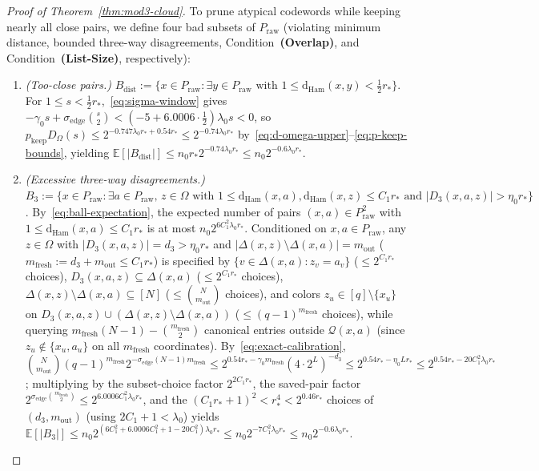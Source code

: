 \documentclass[11pt]{article}
\theoremstyle{definition}
\theoremstyle{remark}
\newcommand{\Ham}{\mathrm{Ham}}
\newcommand{\dHam}{\mathrm{d}_{\Ham}}
\begin{document}
\begin{proof}[Proof of Theorem~\ref{thm:mod3-cloud}]
To prune atypical codewords while keeping nearly all close pairs, we define four bad subsets of $P_{\mathrm{raw}}$ (violating minimum distance, bounded three-way disagreements, Condition~\textbf{(Overlap)}, and Condition~\textbf{(List-Size)}, respectively):
\begin{enumerate}[label=(\arabic*),leftmargin=2em]
  \item \emph{(Too-close pairs.)} $B_{\mathrm{dist}} := \bigl\{x \in P_{\mathrm{raw}} : \exists y \in P_{\mathrm{raw}} \text{ with } 1 \le \dHam(x, y) < \frac{1}{2} r_*\bigr\}$. For $1 \le s < \frac{1}{2} r_*$,~\eqref{eq:sigma-window} gives $-\gamma_0 s + \sigma_{\mathrm{edge}}\binom{s}{2} < (-5 + 6.0006 \cdot \frac{1}{2})\lambda_0 s < 0$, so $p_{\mathrm{keep}} D_\Omega(s) \le 2^{-0.747\lambda_0 r_* + 0.54 r_*} \le 2^{-0.74\lambda_0 r_*}$ by~\eqref{eq:d-omega-upper}--\eqref{eq:p-keep-bounds}, yielding $\mathbb{E}[|B_{\mathrm{dist}}|] \le n_0 r_* 2^{-0.74\lambda_0 r_*} \le n_0 2^{-0.6 \lambda_0 r_*}$.
  \item \emph{(Excessive three-way disagreements.)} $B_3 := \bigl\{x \in P_{\mathrm{raw}} : \exists a \in P_{\mathrm{raw}},\, z \in \Omega \text{ with } 1 \le \dHam(x, a), \dHam(x, z) \le C_1 r_* \text{ and } |D_3(x, a, z)| > \eta_0 r_*\bigr\}$. By~\eqref{eq:ball-expectation}, the expected number of pairs $(x, a) \in P_{\mathrm{raw}}^2$ with $1 \le \dHam(x, a) \le C_1 r_*$ is at most $n_0 2^{6 C_1^2 \lambda_0 r_*}$. Conditioned on $x, a \in P_{\mathrm{raw}}$, any $z \in \Omega$ with $|D_3(x, a, z)| = d_3 > \eta_0 r_*$ and $|\Delta(x, z) \setminus \Delta(x, a)| = m_{\mathrm{out}}$ ($m_{\mathrm{fresh}} := d_3 + m_{\mathrm{out}} \le C_1 r_*$) is specified by $\{v \in \Delta(x, a) : z_v = a_v\}$ ($\le 2^{C_1 r_*}$ choices), $D_3(x, a, z) \subseteq \Delta(x, a)$ ($\le 2^{C_1 r_*}$ choices), $\Delta(x, z) \setminus \Delta(x, a) \subseteq [N]$ ($\le \binom{N}{m_{\mathrm{out}}}$ choices), and colors $z_u \in [q] \setminus \{x_u\}$ on $D_3(x, a, z) \cup (\Delta(x, z) \setminus \Delta(x, a))$ ($\le (q - 1)^{m_{\mathrm{fresh}}}$ choices), while querying $m_{\mathrm{fresh}}(N - 1) - \binom{m_{\mathrm{fresh}}}{2}$ canonical entries outside $\mathcal{Q}(x, a)$ (since $z_u \notin \{x_u, a_u\}$ on all $m_{\mathrm{fresh}}$ coordinates). By~\eqref{eq:exact-calibration}, $\binom{N}{m_{\mathrm{out}}}(q - 1)^{m_{\mathrm{fresh}}} 2^{-\sigma_{\mathrm{edge}}(N - 1)m_{\mathrm{fresh}}} \le 2^{0.54 r_* - \gamma_0 m_{\mathrm{fresh}}}(4 \cdot 2^L)^{-d_3} \le 2^{0.54 r_* - \eta_0 L r_*} \le 2^{0.54 r_* - 20 C_1^2 \lambda_0 r_*}$; multiplying by the subset-choice factor $2^{2 C_1 r_*}$, the saved-pair factor $2^{\sigma_{\mathrm{edge}}\binom{m_{\mathrm{fresh}}}{2}} \le 2^{6.0006 C_1^2 \lambda_0 r_*}$, and the $(C_1 r_* + 1)^2 < r_*^4 < 2^{0.46 r_*}$ choices of $(d_3, m_{\mathrm{out}})$ (using $2 C_1 + 1 < \lambda_0$) yields $\mathbb{E}[|B_3|] \le n_0 2^{(6 C_1^2 + 6.0006 C_1^2 + 1 - 20 C_1^2)\lambda_0 r_*} \le n_0 2^{-7 C_1^2 \lambda_0 r_*} \le n_0 2^{-0.6\lambda_0 r_*}$.

\end{enumerate}
\end{proof}
\end{document}
